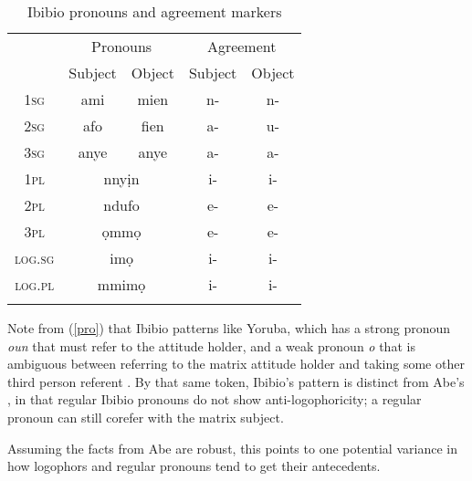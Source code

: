 \documentclass[output=paper]{langscibook}
\begin{document}
\begin{table}
\centering
\begin{tabular}{>{\scshape}ccccc}
\lsptoprule
	& \multicolumn{2}{c}{Pronouns}	&	\multicolumn{2}{c}{Agreement}	\\\cmidrule(lr){2-3}\cmidrule(lr){4-5}
	&	Subject		&	Object		&	Subject 	&	Object			\\ \midrule
1sg	&	ami	&	mien	&	n- & n-	\\
2sg	&	afo	&	fien	& a-	& u- 		\\
3sg	&	anye	&	anye	& a-	&	a-	\\ 
1pl	&	\multicolumn{2}{c}{nny\d{i}n}	&	i-	&	i-	\\
2pl	&	\multicolumn{2}{c}{ndufo}	& e-	& e-	\\
3pl	&	\multicolumn{2}{c}{\d{o}mm\d{o}} & e-		& e- \\
\textsc{log.sg}	& \multicolumn{2}{c}{im\d{o}}	&	i-	& i-	\\
\textsc{log.pl}	&	\multicolumn{2}{c}{mmim\d{o}}	& i-	& i-	\\
\lspbottomrule
\end{tabular}
\caption{Ibibio pronouns and agreement markers}
\end{table}



Note from (\ref{pro}) that Ibibio patterns like Yoruba, which has a strong pronoun \textit{oun} that must refer to the attitude holder, and a weak pronoun \textit{o} that is ambiguous between referring to the matrix attitude holder and taking some other third person referent \citep[(\ref{yor})][]{Adesola2005}. By that same token, Ibibio's pattern is distinct from Abe's \citep[(\ref{abe})]{Koopman1989}, in that regular Ibibio pronouns do not show anti-logophoricity; a regular pronoun can still corefer with the matrix subject.
\begin{exe}
	\label{yor}
	
	\label{abe}
\end{exe}
Assuming the facts from Abe are robust, this points to one potential variance in how logophors and regular pronouns tend to get their antecedents.
\end{document}
